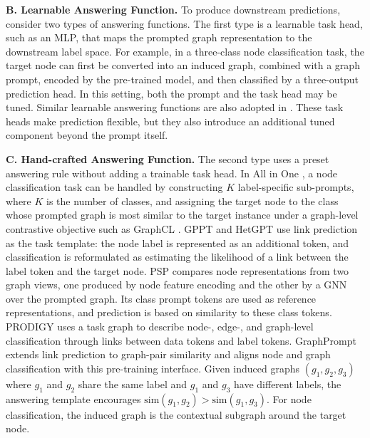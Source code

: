 \textbf{B. Learnable Answering Function.} 
To produce downstream predictions, \citet{sun2023all} consider two types of answering functions. The first type is a learnable task head, such as an MLP, that maps the prompted graph representation to the downstream label space. For example, in a three-class node classification task, the target node can first be converted into an induced graph, combined with a graph prompt, encoded by the pre-trained model, and then classified by a three-output prediction head. In this setting, both the prompt and the task head may be tuned. Similar learnable answering functions are also adopted in \cite{fang2022prompt, fang2023universal,tan2023virtual}. These task heads make prediction flexible, but they also introduce an additional tuned component beyond the prompt itself.



\textbf{C. Hand-crafted Answering Function.} 
The second type uses a preset answering rule without adding a trainable task head. In All in One \cite{sun2023all}, a node classification task can be handled by constructing $K$ label-specific sub-prompts, where $K$ is the number of classes, and assigning the target node to the class whose prompted graph is most similar to the target instance under a graph-level contrastive objective such as GraphCL \cite{you2020graph}. GPPT \cite{sun2022gppt} and HetGPT \cite{ma2023hetgpt} use link prediction as the task template: the node label is represented as an additional token, and classification is reformulated as estimating the likelihood of a link between the label token and the target node. 
PSP \cite{ge2024psp} compares node representations from two graph views, one produced by node feature encoding and the other by a GNN over the prompted graph. Its class prompt tokens are used as reference representations, and prediction is based on similarity to these class tokens. PRODIGY \cite{huang2023prodigy} uses a task graph to describe node-, edge-, and graph-level classification through links between data tokens and label tokens. GraphPrompt \cite{liu2023graphprompt} extends link prediction to graph-pair similarity and aligns node and graph classification with this pre-training interface. Given induced graphs $(g_1,g_2,g_3)$ where $g_1$ and $g_2$ share the same label and $g_1$ and $g_3$ have different labels, the answering template encourages $\text{sim}(g_1,g_2)>\text{sim}(g_1,g_3)$. For node classification, the induced graph is the contextual subgraph around the target node.



